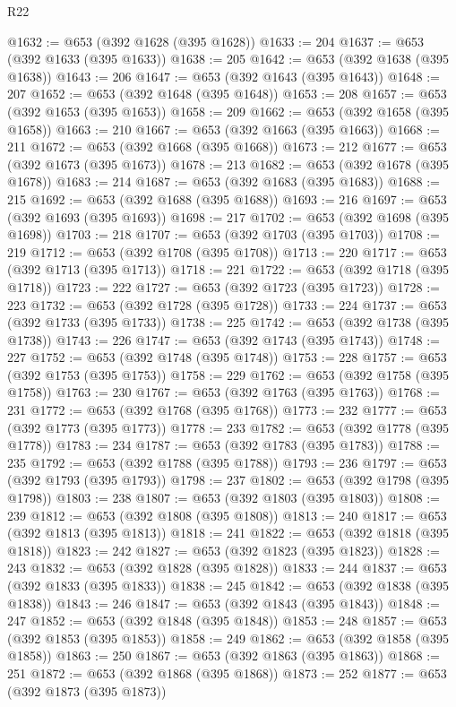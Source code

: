 \begin{lexlean}{R22}
\begin{coremodule}
@1632 := @653 (@392 @1628 (@395 @1628))
@1633 := 204
@1637 := @653 (@392 @1633 (@395 @1633))
@1638 := 205
@1642 := @653 (@392 @1638 (@395 @1638))
@1643 := 206
@1647 := @653 (@392 @1643 (@395 @1643))
@1648 := 207
@1652 := @653 (@392 @1648 (@395 @1648))
@1653 := 208
@1657 := @653 (@392 @1653 (@395 @1653))
@1658 := 209
@1662 := @653 (@392 @1658 (@395 @1658))
@1663 := 210
@1667 := @653 (@392 @1663 (@395 @1663))
@1668 := 211
@1672 := @653 (@392 @1668 (@395 @1668))
@1673 := 212
@1677 := @653 (@392 @1673 (@395 @1673))
@1678 := 213
@1682 := @653 (@392 @1678 (@395 @1678))
@1683 := 214
@1687 := @653 (@392 @1683 (@395 @1683))
@1688 := 215
@1692 := @653 (@392 @1688 (@395 @1688))
@1693 := 216
@1697 := @653 (@392 @1693 (@395 @1693))
@1698 := 217
@1702 := @653 (@392 @1698 (@395 @1698))
@1703 := 218
@1707 := @653 (@392 @1703 (@395 @1703))
@1708 := 219
@1712 := @653 (@392 @1708 (@395 @1708))
@1713 := 220
@1717 := @653 (@392 @1713 (@395 @1713))
@1718 := 221
@1722 := @653 (@392 @1718 (@395 @1718))
@1723 := 222
@1727 := @653 (@392 @1723 (@395 @1723))
@1728 := 223
@1732 := @653 (@392 @1728 (@395 @1728))
@1733 := 224
@1737 := @653 (@392 @1733 (@395 @1733))
@1738 := 225
@1742 := @653 (@392 @1738 (@395 @1738))
@1743 := 226
@1747 := @653 (@392 @1743 (@395 @1743))
@1748 := 227
@1752 := @653 (@392 @1748 (@395 @1748))
@1753 := 228
@1757 := @653 (@392 @1753 (@395 @1753))
@1758 := 229
@1762 := @653 (@392 @1758 (@395 @1758))
@1763 := 230
@1767 := @653 (@392 @1763 (@395 @1763))
@1768 := 231
@1772 := @653 (@392 @1768 (@395 @1768))
@1773 := 232
@1777 := @653 (@392 @1773 (@395 @1773))
@1778 := 233
@1782 := @653 (@392 @1778 (@395 @1778))
@1783 := 234
@1787 := @653 (@392 @1783 (@395 @1783))
@1788 := 235
@1792 := @653 (@392 @1788 (@395 @1788))
@1793 := 236
@1797 := @653 (@392 @1793 (@395 @1793))
@1798 := 237
@1802 := @653 (@392 @1798 (@395 @1798))
@1803 := 238
@1807 := @653 (@392 @1803 (@395 @1803))
@1808 := 239
@1812 := @653 (@392 @1808 (@395 @1808))
@1813 := 240
@1817 := @653 (@392 @1813 (@395 @1813))
@1818 := 241
@1822 := @653 (@392 @1818 (@395 @1818))
@1823 := 242
@1827 := @653 (@392 @1823 (@395 @1823))
@1828 := 243
@1832 := @653 (@392 @1828 (@395 @1828))
@1833 := 244
@1837 := @653 (@392 @1833 (@395 @1833))
@1838 := 245
@1842 := @653 (@392 @1838 (@395 @1838))
@1843 := 246
@1847 := @653 (@392 @1843 (@395 @1843))
@1848 := 247
@1852 := @653 (@392 @1848 (@395 @1848))
@1853 := 248
@1857 := @653 (@392 @1853 (@395 @1853))
@1858 := 249
@1862 := @653 (@392 @1858 (@395 @1858))
@1863 := 250
@1867 := @653 (@392 @1863 (@395 @1863))
@1868 := 251
@1872 := @653 (@392 @1868 (@395 @1868))
@1873 := 252
@1877 := @653 (@392 @1873 (@395 @1873))

\end{coremodule}
\end{lexlean}
